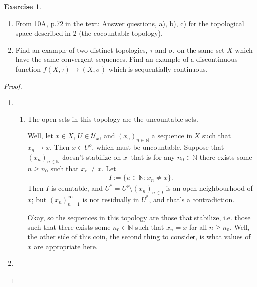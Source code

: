 \documentclass[12pt]{extarticle}
\newcommand{\set}[1]{\{#1\}}
\newcommand{\N}{\mathbb{N}}
\newcommand{\<}{\langle}
\renewcommand{\>}{\rangle}
\theoremstyle{definition}
\newtheorem{exercise}{Exercise}
\begin{document}
\begin{exercise}
  \begin{enumerate}
  \item
    From 10A, p.72 in the text: Answer questions, a), b), c) for the topological space described in 2 (the cocountable topology).
  \item
    Find an example of two distinct topologies, $\tau$ and $\sigma$, on the same set $X$ which have the same convergent sequences. Find an example of a discontinuous function $f(X, \tau) \to (X, \sigma)$ which is sequentially continuous. 
  \end{enumerate}
\end{exercise}
\begin{proof}
  \begin{enumerate}
  \item
    \begin{enumerate}
    \item
      The open sets in this topology are the uncountable sets. 


      
      Well, let $x \in X$, $U \in \mathcal{U}_x$, and $(x_n)_{n \in \N}$ a sequence in $X$ such that $x_n \to x$.
      Then $x \in U^o$, which must be uncountable. Suppose that $(x_n)_{n \in \N}$ doesn't stabilize on $x$,
      that is for any $n_0 \in \N$ there exists some $n \geq n_0$ such that $x_n \neq x$. Let
      \begin{align*}
        I := \set{n \in \N: x_n \neq x}.
      \end{align*}
      Then $I$ is countable, and $U^* = U^o \setminus (x_n)_{n \in I}$ is an open neighbourhood of $x$; but $(x_n)_{n=1}^{\infty}$
      is not residually in $U^*$, and that's a contradiction.

      Okay, so the sequences in this topology are those that stabilize, i.e. those such that there exists some $n_0 \in \N$
      such that $x_n = x$ for all $n \geq n_0$. Well, the other side of this coin, the second thing to consider, is what values
      of $x$ are appropriate here. 

    \end{enumerate}
  \item
    
  \end{enumerate}
\end{proof}
\end{document}
